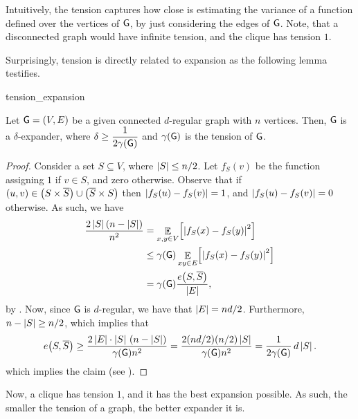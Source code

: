 Intuitively, the tension captures how close is estimating the variance
of a function defined over the vertices of $\mathsf{G}$, by just
considering the edges of $\mathsf{G}$. Note, that a disconnected graph
would have infinite tension, and the clique has tension $1$.

Surprisingly, tension is directly related to expansion as the
following lemma testifies.

\begin{fragment}{tension_expansion}
\begin{lemma}
    Let $\mathsf{G}=(V,E)$ be a given connected $d$-regular graph with $n$
    vertices. Then, $\mathsf{G}$ is a $\delta$-expander, where
    $\displaystyle \delta \geq \frac{1}{2 \DialX{\Graph}}$ and 
    $\DialX{\Graph}$ is the tension of $\mathsf{G}$.

\end{lemma}
\end{fragment}

\begin{proof}
    Consider a set $S \subseteq V$, where $\left| {S} \right| \leq n/2$. Let
    $f_S(v)$ be the function assigning $1$ if $v \in S$, and zero
    otherwise. Observe that if $(u,v) \in \pth{S \times \overline{S} }
    \cup \pth{ \overline{S} \times S}$ then $\left| {f_S(u)-f_S(v)} \right| =
    1$, and $\left| {f_S(u)-f_S(v)} \right|=0$ otherwise. As such, we have
    \begin{align*}
    \frac{2 \cardin{S}\pth{n-\cardin{S}}}{n^2} &= \ExExt{x,y \in
       V}{\cardin{f_S(x)- f_S(y)}^2}
    \\
    &\leq \DialX{\Graph} \ExExt{ xy
       \in E}{\cardin{f_S(x)- f_S(y)}^2}
    \\
    &= \DialX{\Graph}
    \frac{e\pth{S, \overline{S}}}{\cardin{E}},
    \end{align*}
    by . Now, since $\mathsf{G}$ is $d$-regular, we have
    that $\left| {E} \right| = nd/2$. Furthermore, $n- \left| {S} \right| \geq n/2$,
    which implies that
    \[
    e\pth{S, \overline{S}}%
    \geq%
    \frac{2\cardin{E}\cdot
       \cardin{S}\,\pth{n-\cardin{S}}}{\DialX{\Graph}n^2} = \frac{2(n
       d/2)(n/2) \cardin{S}}{ \DialX{\Graph} n^2} = \frac{1}{2
       \DialX{\Graph}} \, d\cardin{S}.
    \]
    which implies the claim (see ).
\end{proof}

\bigskip

Now, a clique has tension $1$, and it has the best expansion
possible. As such, the smaller the tension of a graph, the better
expander it is.


